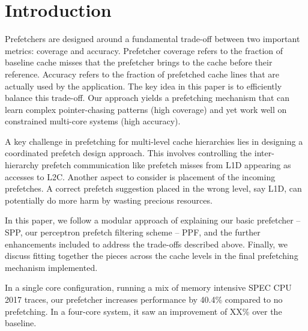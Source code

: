 \section{Introduction}
\label{Introduction}

Prefetchers are designed around a fundamental trade-off between two
important metrics: coverage and accuracy. Prefetcher coverage refers
to the fraction of baseline cache misses that the prefetcher brings to
the cache before their reference. Accuracy refers to the fraction of
prefetched cache lines that are actually used by the application. The
key idea in this paper is to efficiently balance this trade-off. Our
approach yields a prefetching mechanism that can learn complex
pointer-chasing patterns (high coverage) and yet work well on
constrained multi-core systems (high accuracy).

A key challenge in prefetching for multi-level cache hierarchies lies
in designing a coordinated prefetch design approach.  This involves
controlling the inter-hierarchy prefetch communication like prefetch
misses from L1D appearing as accesses to L2C.  Another aspect to
consider is placement of the incoming prefetches.  A correct prefetch
suggestion placed in the wrong level, say L1D, can potentially do more
harm by wasting precious resources.

In this paper, we follow a modular approach of explaining our basic
prefetcher -- SPP, our perceptron prefetch filtering scheme -- PPF, and the
further enhancements included to address the trade-offs described
above.  Finally, we discuss fitting together the pieces across the
cache levels in the final prefetching mechanism implemented.

In a single core configuration, running a mix of memory intensive SPEC
CPU 2017 traces, our prefetcher increases performance by 40.4\% compared to no
prefetching.  In a four-core system, it saw an improvement of XX\%
over the baseline.

